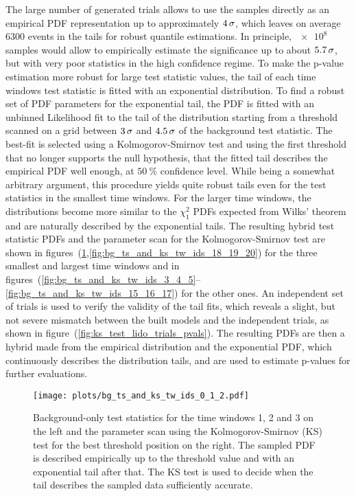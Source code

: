 The large number of generated trials allows to use the samples directly as an empirical PDF representation up to approximately $\num{4}\,\sigma$, which leaves on average $\num{6300}$ events in the tails for robust quantile estimations.
In principle, $\num{e8}$ samples would allow to empirically estimate the significance up to about $\num{5.7}\,\sigma$, but with very poor statistics in the high confidence regime.
To make the p-value estimation more robust for large test statistic values, the tail of each time windows test statistic is fitted with an exponential distribution.
To find a robust set of PDF parameters for the exponential tail, the PDF is fitted with an unbinned Likelihood fit to the tail of the distribution starting from a threshold scanned on a grid between $\num{3}\,\sigma$ and $\num{4.5}\,\sigma$ of the background test statistic.
The best-fit is selected using a Kolmogorov-Smirnov test \cite{Horn:1977KSTest} and using the first threshold that no longer supports the null hypothesis, that the fitted tail describes the empirical PDF well enough, at $\SI{50}{\percent}$ confidence level.
While being a somewhat arbitrary argument, this procedure yields quite robust tails even for the test statistics in the smallest time windows.
For the larger time windows, the distributions become more similar to the $\chi^2_1$ PDFs expected from Wilks' theorem and are naturally described by the exponential tails.
The resulting hybrid test statistic PDFs and the parameter scan for the Kolmogorov-Smirnov test are shown in figures~(\ref{fig:bg_ts_and_ks_tw_ids_0_1_2},\ref{fig:bg_ts_and_ks_tw_ids_18_19_20}) for the three smallest and largest time windows and in figures~(\ref{fig:bg_ts_and_ks_tw_ids_3_4_5}--\ref{fig:bg_ts_and_ks_tw_ids_15_16_17}) for the other ones.
An independent set of trials is used to verify the validity of the tail fits, which reveals a slight, but not severe mismatch between the built models and the independent trials, as shown in figure~(\ref{fig:ks_test_lido_trials_pvals}).
The resulting PDFs are then a hybrid made from the empirical distribution and the exponential PDF, which continuously describes the distribution tails, and are used to estimate p-values for further evaluations.

\begin{figure}[htbp]
  \centering
  \texttt{[image: plots/bg\_ts\_and\_ks\_tw\_ids\_0\_1\_2.pdf]}
  \caption[Background test statistics for the time windows 1, 2 and 3]{
    Background-only test statistics for the time windows 1, 2 and 3 on the left and the parameter scan using the Kolmogorov-Smirnov (KS) test for the best threshold position on the right.
    The sampled PDF is described empirically up to the threshold value and with an exponential tail after that.
    The KS test is used to decide when the tail describes the sampled data sufficiently accurate.
  }
  \label{fig:bg_ts_and_ks_tw_ids_0_1_2}
\end{figure}


